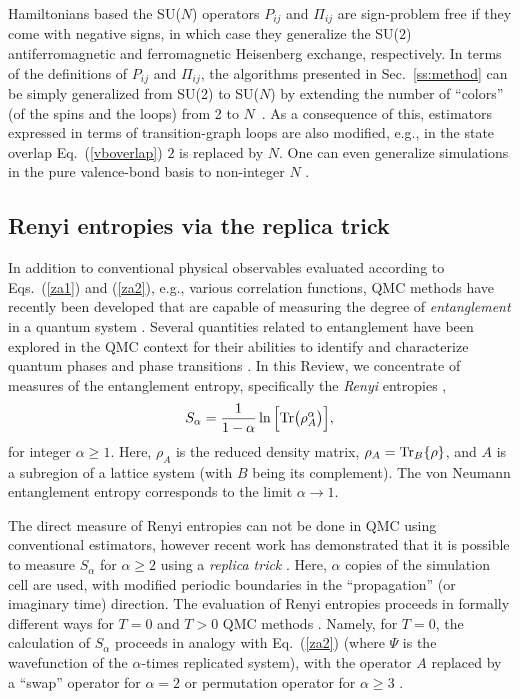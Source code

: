 \documentclass[10pt,pre,aps,twocolumn,showpacs,subscriptaddresses,floatfix]{revtex4}
\begin{document}
Hamiltonians based the SU($N$) operators $P_{ij}$ and $\Pi_{ij}$ are sign-problem free if they come with negative signs, in which case
they generalize the SU($2$) antiferromagnetic and ferromagnetic Heisenberg exchange, respectively. In terms of the definitions of $P_{ij}$ and 
$\Pi_{ij}$, the algorithms presented in Sec.~\ref{ss:method} can be simply generalized from SU(2) to SU($N$) by extending the number of ``colors'' 
(of the spins and the loops) from 2 to $N$~\cite{harada2003:sun,beach2009:sun,kaul2011:j1j2}. As a consequence of this, estimators expressed in terms
of transition-graph loops are also modified, e.g., in the state overlap Eq.~(\ref{vboverlap}) $2$ is replaced by $N$. One can even generalize
simulations in the pure valence-bond basis to non-integer $N$ \cite{beach2009:sun}.

\subsection{Renyi entropies via the replica trick} 
\label{ss:renyi}

In addition to conventional physical observables evaluated according to Eqs.~(\ref{za1}) and (\ref{za2}), e.g., various correlation functions, 
QMC methods have recently been developed that are capable of measuring the degree of {\it entanglement} in a quantum system \cite{EntangleMeasure}. Several 
quantities related to entanglement have been explored in the QMC context for their abilities to identify and characterize quantum phases and phase 
transitions \cite{Tommaso1,Tommaso2,fluc1,fluc2,fid1,fid2}.  In this Review, we concentrate of measures of the entanglement entropy, specifically 
the {\it Renyi} entropies \cite{renyi},
\begin{equation}
S_{\alpha} = \frac{1}{1-\alpha} \ln \Big[ {\rm Tr}\big( \rho_A^{\alpha} \big) \Big],
\end{equation}
for integer $\alpha \ge 1$.  Here, $\rho_A$ is the reduced density matrix, $\rho_A = {\rm Tr}_B \{\rho\}$, and $A$ is a subregion of 
a lattice system (with $B$ being its complement). The von Neumann entanglement entropy corresponds to the limit $\alpha \to 1$.
 
The direct measure of Renyi entropies can not be done in QMC using conventional estimators, however recent work has demonstrated that it is possible to measure 
$S_{\alpha}$ for $\alpha \ge 2$ using a {\it replica trick} \cite{Holz,Cardy,Fradkin,BP,Naka}.  Here, $\alpha$ copies of the simulation cell are used, with modified 
periodic boundaries in the ``propagation'' (or imaginary time) direction.  The evaluation of Renyi entropies proceeds in formally different ways for $T=0$ and $T>0$ 
QMC methods \cite{Hastings10,Melko10}.  Namely, for $T=0$, the calculation of $S_{\alpha}$ proceeds in analogy with Eq.~(\ref{za2}) (where $\Psi$ is the wavefunction 
of the $\alpha$-times replicated system), with the operator $A$ replaced by a ``swap'' operator for $\alpha=2$ \cite{Hastings10} or permutation operator for 
$\alpha \ge 3$ \cite{Kallin11}. 
\end{document}
